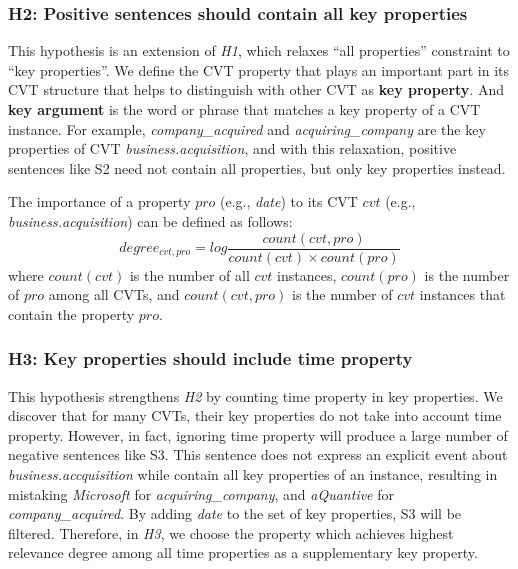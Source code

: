 \subsubsection{H2: Positive sentences should contain all key properties}
This hypothesis is an extension of \emph{H1}, which relaxes ``all properties'' constraint to ``key properties''. We define the CVT property that plays an important part in its CVT structure that helps to distinguish with other CVT as \textbf{key property}. And \textbf{key argument} is the word or phrase that matches a key property of a CVT instance. For example, \emph{company\_acquired} and \emph{acquiring\_company} are the key properties of CVT \emph{business.acquisition}, and with this relaxation, positive sentences like S2 need not contain all properties, but only key properties instead.

The importance of a property $pro$ (e.g., \emph{date}) to its CVT $cvt$ (e.g., \emph{business.acquisition}) can be defined as follows:
\begin{equation}
	degree_{cvt, pro} = log \frac{count(cvt, pro)}{count(cvt) \times count(pro)} 
\end{equation}
where $count(cvt)$ is the number of all $cvt$ instances, $count(pro)$ is the number of $pro$ among all CVTs, and $count(cvt, pro)$ is the number of $cvt$ instances that contain the property $pro$.

\subsubsection{H3: Key properties should include time property}
This hypothesis strengthens \emph{H2} by counting time property in key properties. We discover that for many CVTs, their key properties do not take into account time property. However, in fact, ignoring time property will produce a large number of negative sentences like S3. This sentence does not express an explicit event about \emph{business.accquisition} while contain all key properties of an instance, resulting in mistaking \emph{Microsoft} for \emph{acquiring\_company}, and \emph{aQuantive} for \emph{company\_acquired}. By adding \emph{date} to the set of key properties, S3 will be filtered. Therefore, in \emph{H3}, we choose the property which achieves highest relevance degree among all time properties as a supplementary key property. 

